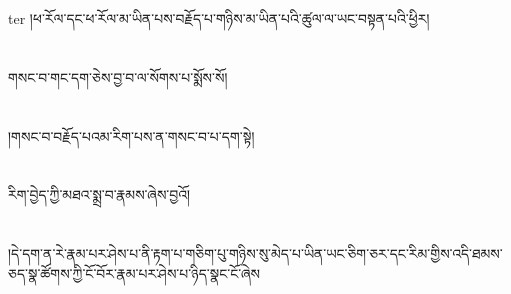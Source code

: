 ter{ }།ཕ་རོལ་དང་ཕ་རོལ་མ་ཡིན་པས་བརྗོད་པ་གཉིས་མ་ཡིན་པའི་ཚུལ་ལ་ཡང་བསྟན་པའི་ཕྱིར།\chapter{ }གསང་བ་གང་དག་ཅེས་བྱ་བ་ལ་སོགས་པ་སྨོས་སོ།\chapter{ }།གསང་བ་བརྗོད་པའམ་རིག་པས་ན་གསང་བ་པ་དག་སྟེ།\chapter{ }རིག་བྱེད་ཀྱི་མཐའ་སྨྲ་བ་རྣམས་ཞེས་བྱའོ།\chapter{ }།དེ་དག་ན་རེ་རྣམ་པར་ཤེས་པ་ནི་རྟག་པ་གཅིག་པུ་གཉིས་སུ་མེད་པ་ཡིན་ཡང་ཅིག་ཅར་དང་རིམ་གྱིས་འདི་ཐམས་ཅད་སྣ་ཚོགས་ཀྱི་ངོ་བོར་རྣམ་པར་ཤེས་པ་ཉིད་སྣང་ངོ་ཞེས